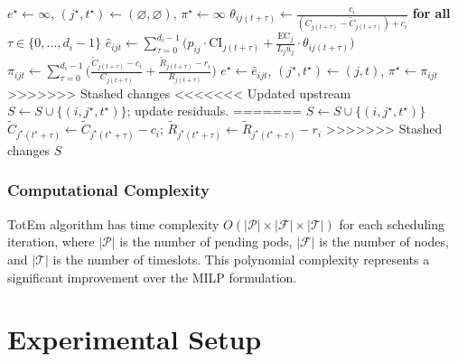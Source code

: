 \documentclass[10pt,journal,compsoc]{IEEEtran}
\begin{document}
\begin{algorithm}[htbp]
\begin{algorithmic}[1]
  \State $e^\star \gets \infty$, $(j^\star,t^\star)\gets (\varnothing,\varnothing)$, $\pi^\star \gets \infty$
        \State $\theta_{ij(t+\tau)} \gets \frac{c_i}{(C_{j(t+\tau)}-\tilde C_{j(t+\tau)}) + c_i}$ \textbf{for all} $\tau \in \{0,\ldots,d_i-1\}$
        \State $\widehat e_{ijt} \gets \sum_{\tau=0}^{d_i-1}\Big( p_{ij}\cdot \mathrm{CI}_{j(t+\tau)} + \frac{\mathrm{EC}_j}{L_j u_j} \cdot \theta_{ij(t+\tau)} \Big)$
        \State $\pi_{ijt} \gets \sum_{\tau=0}^{d_i-1}\Big(\frac{\tilde C_{j(t+\tau)}-c_i}{C_{j(t+\tau)}} + \frac{\tilde R_{j(t+\tau)}-r_i}{R_{j(t+\tau)}}\Big)$
          \State $e^\star \gets \widehat e_{ijt}$, $(j^\star,t^\star)\gets (j,t)$, $\pi^\star \gets \pi_{ijt}$
        \EndIf
>>>>>>> Stashed changes
      \EndIf
    \EndIf
  \EndFor
<<<<<<< Updated upstream
   $S \gets S \cup \{(i,j^\star,t^\star)\}$; update residuals. \EndIf
=======
    \State $S \gets S \cup \{(i,j^\star,t^\star)\}$
      \State $\tilde C_{j^\star(t^\star+\tau)} \gets \tilde C_{j^\star(t^\star+\tau)} - c_i$; \quad
             $\tilde R_{j^\star(t^\star+\tau)} \gets \tilde R_{j^\star(t^\star+\tau)} - r_i$
    \EndFor
  \EndIf
>>>>>>> Stashed changes
\EndFor
\State \Return $S$
\end{algorithmic}
\end{algorithm}



\subsubsection{Computational Complexity}\label{s:totem-complex}

TotEm algorithm has time complexity $O(|\mathcal{P}| \times |\mathcal{F}| \times |\mathcal{T}|)$ for each scheduling iteration, where $|\mathcal{P}|$ is the number of pending pods, $|\mathcal{F}|$ is the number of nodes, and $|\mathcal{T}|$ is the number of timeslots. This polynomial complexity represents a significant improvement over the MILP formulation.

\section{Experimental Setup}\label{s:setup}
\end{document}
